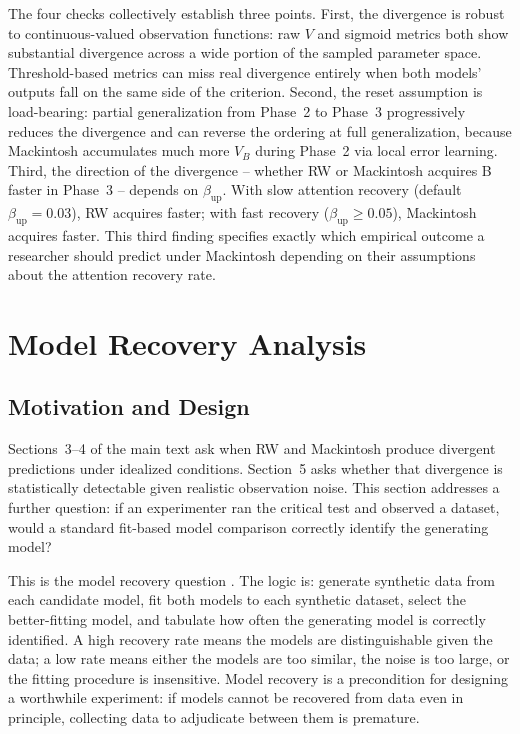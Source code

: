 \documentclass[11pt,a4paper]{article}
\begin{document}
The four checks collectively establish three points. First, the divergence is robust to continuous-valued observation functions: raw $V$ and sigmoid metrics both show substantial divergence across a wide portion of the sampled parameter space. Threshold-based metrics can miss real divergence entirely when both models' outputs fall on the same side of the criterion. Second, the reset assumption is load-bearing: partial generalization from Phase~2 to Phase~3 progressively reduces the divergence and can reverse the ordering at full generalization, because Mackintosh accumulates much more $V_B$ during Phase~2 via local error learning. Third, the direction of the divergence -- whether RW or Mackintosh acquires B faster in Phase~3 -- depends on $\beta_{\text{up}}$. With slow attention recovery (default $\beta_{\text{up}} = 0.03$), RW acquires faster; with fast recovery ($\beta_{\text{up}} \geq 0.05$), Mackintosh acquires faster. This third finding specifies exactly which empirical outcome a researcher should predict under Mackintosh depending on their assumptions about the attention recovery rate.

\clearpage



\section{Model Recovery Analysis}
\label{sec:s3}

\subsection{Motivation and Design}
\label{sec:s3_motivation}

Sections~3--4 of the main text ask when RW and Mackintosh produce divergent predictions under idealized conditions. Section~5 asks whether that divergence is statistically detectable given realistic observation noise. This section addresses a further question: if an experimenter ran the critical test and observed a dataset, would a standard fit-based model comparison correctly identify the generating model?

This is the model recovery question \citep{wilson2019ten}. The logic is: generate synthetic data from each candidate model, fit both models to each synthetic dataset, select the better-fitting model, and tabulate how often the generating model is correctly identified. A high recovery rate means the models are distinguishable given the data; a low rate means either the models are too similar, the noise is too large, or the fitting procedure is insensitive. Model recovery is a precondition for designing a worthwhile experiment: if models cannot be recovered from data even in principle, collecting data to adjudicate between them is premature.
\end{document}
